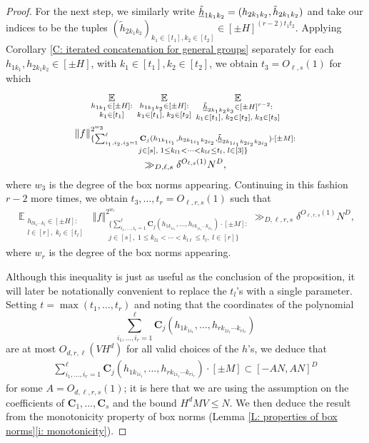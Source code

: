 \documentclass[11pt]{amsart}
\theoremstyle{definition}
\DeclareMathOperator*{\E}{\mathbb{E}}
\newcommand{\bc}{{\textbf{C}}}
\newcommand{\uh}{{\underline{h}}}
\newcommand{\norm}[1]{\left\Vert #1\right\Vert}
\begin{document}
\begin{proof}
    For the next step, we similarly write $\Tilde{\uh}_{1k_1k_2}=(h_{2k_1k_2}, \Tilde{h}_{2k_1k_2})$ and take our indices to be the tuples $(\tilde{h}_{2k_1k_2})_{k_1\in[t_1], k_2\in[t_2]}\in[\pm H]^{(r-2)t_1 t_2}$.  Applying Corollary \ref{C: iterated concatenation for general groups} separately for each $h_{1k_1}, h_{2k_1k_2}\in[\pm H]$, with $k_1\in[t_1], k_2\in[t_2]$, we obtain $t_3 = O_{\ell, s}(1)$ for which
    \begin{multline*}
        \E_{\substack{h_{1k_1}\in[\pm H]:\\ k_1\in[t_1]}}\; \E_{\substack{h_{1k_1 k_2}\in[\pm H]:\\ k_1\in [t_1],\; k_2\in[t_2]}}\;
        \E_{\substack{\Tilde{\uh}_{2k_1 k_2 k_3}\in[\pm H]^{r-2}:\\ k_1\in [t_1],\; k_2\in[t_2],\; k_3\in[t_3]}}\\
        \norm{f}_{\substack{\{\sum_{i_1, i_2, i_3=1}^{\ell}\bc_j(h_{1k_{1i_1}}, h_{2k_{1i_1}k_{2i_2}}, \Tilde{\uh}_{2k_{1i_1}k_{2i_2}k_{3i_3}})\cdot[\pm M]:\\ j\in[s],\; 1\leq k_{l1} < \cdots < k_{l \ell}\leq t_l,\; l\in[3] \}}}^{2^{w_3}}\\ \gg_{D, \ell, s} \delta^{O_{\ell, s}(1)} N^D,
    \end{multline*}
    where $w_3$ is the degree of the box norms appearing. Continuing in this fashion $r-2$ more times, we obtain $t_3, \ldots, t_r=O_{\ell, r, s}(1)$ such that 
        \begin{align*}
        \E_{\substack{h_{lk_1\cdots k_l}\in[\pm H]:\\ l\in[r],\; k_l\in[t_l]}}\;
        \norm{f}_{\substack{\{\sum_{i_1, \ldots, i_r=1}^{\ell}\bc_j(h_{1k_{1i_1}}, \ldots, h_{rk_{1i_1}\cdots k_{ri_r}})\cdot[\pm M]:\\ j\in[s],\; 1\leq k_{l1} < \cdots < k_{l \ell}\leq t_l,\; l\in[r]\}}}^{2^{w_r}} \gg_{D, \ell, r, s} \delta^{O_{\ell, r, s}(1)} N^D,
    \end{align*}
    where $w_r$ is the degree of the box norms appearing.

Although this inequality is just as useful as the conclusion of the proposition, it will later be notationally convenient to replace the $t_l$'s with a single parameter. Setting $t=\max(t_1, \ldots, t_r)$ and noting that the coordinates of the polynomial $$\sum_{i_1, \ldots, i_r=1}^{\ell}\bc_j(h_{1k_{1i_1}}, \ldots, h_{rk_{1i_1}\cdots k_{ri_r}})$$ are at most $O_{d,r,\ell}(V H^d)$ {for all valid choices of the $h$'s}, we deduce that
    \begin{align*}
        \sum_{i_1, \ldots, i_r=1}^{\ell}\bc_j(h_{1k_{1i_1}}, \ldots, h_{rk_{1i_1}\cdots k_{ri_r}})\cdot[\pm M]\subset[-A N, AN]^D
    \end{align*}
    for some $A=O_{d, \ell, r, s}(1)$; it is here that we are using the assumption on the coefficients of $\bc_1, \ldots, \bc_s$ and the bound $H^d M V \leq N$. We then deduce the result from the monotonicity property of box norms (Lemma \ref{L: properties of box norms}\eqref{i: monotonicity}). 
\end{proof} 
\end{document}
